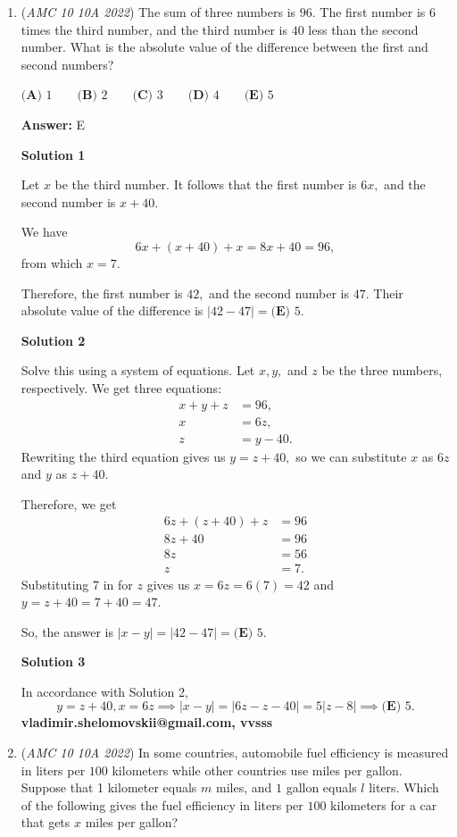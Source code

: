 \begin{enumerate}
 


	\item (\textit{AMC 10 10A 2022}) The sum of three numbers is $96.$ The first number is $6$ times the third number, and the third number is $40$ less than the second number. What is the absolute value of the difference between the first and second numbers?


 $\textbf{(A) } 1 \qquad \textbf{(B) } 2 \qquad \textbf{(C) } 3 \qquad \textbf{(D) } 4 \qquad \textbf{(E) } 5$

 \textbf{Answer: }E



\textbf{Solution 1}

Let $x$ be the third number. It follows that the first number is $6x,$ and the second number is $x+40.$

 We have 
 \[6x+(x+40)+x=8x+40=96,\] from which $x=7.$

 Therefore, the first number is $42,$ and the second number is $47.$ Their absolute value of the difference is $|42-47|=\boxed{\textbf{(E) } 5}.$




\textbf{Solution 2}

Solve this using a system of equations. Let $x,y,$ and $z$ be the three numbers, respectively. We get three equations:
 \begin{align*} x+y+z&=96, \\ x&=6z, \\ z&=y-40. \end{align*}
Rewriting the third equation gives us $y=z+40,$ so we can substitute $x$ as $6z$ and $y$ as $z+40.$

 Therefore, we get
 \begin{align*} 6z+(z+40)+z&=96 \\ 8z+40&=96 \\ 8z&=56 \\ z&=7. \end{align*}
Substituting 7 in for $z$ gives us $x=6z=6(7)=42$ and $y=z+40=7+40=47.$

 So, the answer is $|x-y|=|42-47|=\boxed{\textbf{(E) } 5}.$




\textbf{Solution 3}

In accordance with Solution 2, 
 \[y = z+40, x = 6z \implies |x-y| = |6z - z - 40| = 5|z - 8| \implies \boxed{\textbf{(E) } 5}.\]\textbf{vladimir.shelomovskii@gmail.com, vvsss}

 


	\item (\textit{AMC 10 10A 2022}) In some countries, automobile fuel efficiency is measured in liters per $100$ kilometers while other countries use miles per gallon. Suppose that 1 kilometer equals $m$ miles, and $1$ gallon equals $l$ liters. Which of the following gives the fuel efficiency in liters per $100$ kilometers for a car that gets $x$ miles per gallon?



\end{enumerate}
